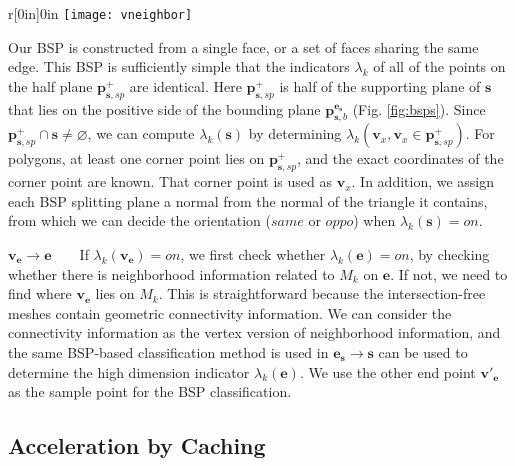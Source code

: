 %
\vspace{0.5em}
\begin{wrapfigure}{r}[0in]{0in}
 \texttt{[image: vneighbor]}
\end{wrapfigure}
Our BSP is constructed from a single face, or a set of faces sharing the same edge. This BSP is sufficiently simple that the indicators $\lambda_k$ of all of the points on the half plane $\bm{p}_{\bm{s}, sp}^+$ are identical. Here $\bm{p}_{\bm{s}, sp}^+$ is half of the supporting plane of $\bm{s}$ that lies on the positive side of the bounding plane $\bm{p}_{\bm{s}, b}^{\bm{e}_{\bm{s}}}$ (Fig. \ref{fig:bsps}). Since $\bm{p}_{\bm{s}, sp}^+ \cap \bm{s} \neq \varnothing$, we can compute $\lambda_k(\bm{s})$ by determining $\lambda_k(\bm{v}_x, \bm{v}_x \in \bm{p}_{\bm{s}, sp}^+)$. For polygons, at least one corner point lies on $\bm{p}_{\bm{s}, sp}^+$, and the exact coordinates of the corner point are known. That corner point is used as $\bm{v}_x$. In addition, we assign each BSP splitting plane a normal from the normal of the triangle it contains, from which we can decide the orientation ($same$ or $oppo$) when $\lambda_k(\bm{s})=on$.


\noindent\textbf{$\bm{\bm{v}_{\bm{e}}\to e}$}~~~~If $\lambda_k(\bm{v}_{\bm{e}})=on$, we first check whether $\lambda_k(\bm{e}) = on$, by checking whether there is neighborhood information related to $M_k$ on $\bm{e}$. If not, we need to find where $\bm{v}_{\bm{e}}$ lies on $M_k$. This is straightforward because the intersection-free meshes contain geometric connectivity information. We can consider the connectivity information as the vertex version of neighborhood information, and the same BSP-based classification method is used in ${\bm{e}_{\bm{s}}\to \bm{s}}$ can be used to determine the high dimension indicator $\lambda_k(\bm{e})$. We use the other end point $\bm{v}'_{\bm{e}}$ as the sample point for the BSP classification.



\subsection{Acceleration by Caching}
\label{sec:acc}


